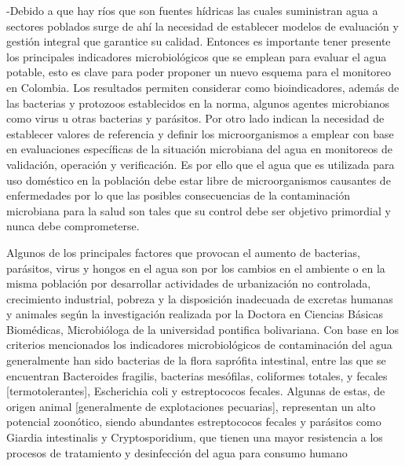 -Debido a que hay ríos que son fuentes hídricas las cuales suministran agua a sectores poblados surge de ahí la necesidad de establecer modelos de evaluación y gestión integral que garantice su calidad. Entonces es importante tener presente los principales indicadores microbiológicos que se emplean para evaluar el agua potable, esto es clave para poder proponer un nuevo esquema para el monitoreo en Colombia. Los resultados permiten considerar como bioindicadores, además de las bacterias y protozoos establecidos en la norma, algunos agentes microbianos como virus u otras bacterias y parásitos. Por otro lado indican la necesidad de establecer valores de referencia y definir los microorganismos a emplear con base en evaluaciones específicas de la situación microbiana del agua en monitoreos de validación, operación y verificación. Es por ello que el agua que es utilizada para uso doméstico en la población debe estar libre de microorganismos causantes de enfermedades por lo que las posibles consecuencias de la contaminación microbiana para la salud son tales que su control debe ser objetivo primordial y nunca debe comprometerse.

Algunos de los principales factores que provocan el aumento de bacterias, parásitos, virus y hongos en el agua son por los cambios en el ambiente o en la misma población por desarrollar actividades de urbanización no controlada, crecimiento industrial, pobreza y la disposición inadecuada de excretas humanas y animales según la investigación realizada por la Doctora en Ciencias Básicas Biomédicas, Microbióloga de la universidad pontifica bolivariana. Con base en los criterios mencionados los indicadores microbiológicos de  contaminación del agua generalmente han sido bacterias de la flora saprófita intestinal, entre las que se encuentran Bacteroides fragilis, bacterias mesófilas, coliformes totales, y fecales [termotolerantes], Escherichia coli y estreptococos fecales. Algunas de estas, de origen animal [generalmente de explotaciones pecuarias], representan un alto potencial zoonótico, siendo abundantes estreptococos fecales y parásitos como Giardia intestinalis y Cryptosporidium, que tienen una mayor resistencia a los procesos de tratamiento y desinfección del agua para consumo humano

